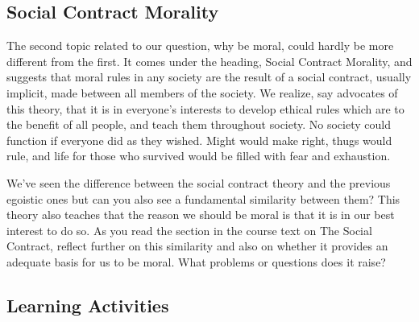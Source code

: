 \documentclass[
]{book}
\begin{document}
\hypertarget{social-contract-morality}{%
\subsection*{Social Contract Morality}\label{social-contract-morality}}

The second topic related to our question, why be moral, could hardly be more
different from the first. It comes under the heading, Social Contract Morality,
and suggests that moral rules in any society are the result of a social
contract, usually implicit, made between all members of the society. We realize,
say advocates of this theory, that it is in everyone's interests to develop
ethical rules which are to the benefit of all people, and teach them throughout
society. No society could function if everyone did as they wished. Might would
make right, thugs would rule, and life for those who survived would be filled
with fear and exhaustion.

We've seen the difference between the social contract theory and the previous
egoistic ones but can you also see a fundamental similarity between them? This
theory also teaches that the reason we should be moral is that it is in our best
interest to do so. As you read the section in the course text on The Social
Contract, reflect further on this similarity and also on whether it provides an
adequate basis for us to be moral. What problems or questions does it raise?

\hypertarget{learning-activities-7}{%
\subsection*{Learning Activities}\label{learning-activities-7}}
\end{document}
